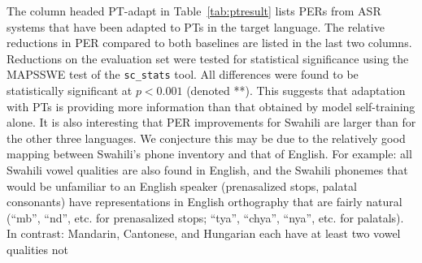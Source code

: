 The column headed {\sc PT-adapt} in Table~\ref{tab:ptresult} lists
PERs from ASR systems that have been adapted to PTs in the target
language.
The relative reductions in PER compared to both baselines
are listed in the last two columns.  Reductions on the evaluation set
were tested for statistical significance using the MAPSSWE test of the
{\tt sc\_stats} tool.  All differences were found to be statistically
significant at $p<0.001$ (denoted **).  This suggests that adaptation
with PTs is providing more information than that obtained by model
self-training alone. It is also interesting that PER
improvements for Swahili are larger than for the other three
languages. %
We conjecture this may be due to the relatively good mapping between
Swahili's phone inventory and that of English. For example: all Swahili
vowel qualities are also found in English, and the Swahili phonemes 
that would be unfamiliar to an English speaker (prenasalized stops, 
palatal consonants) have representations in English orthography that are 
fairly natural (``mb'', ``nd'', etc. for prenasalized stops; ``tya'', 
``chya'', ``nya'', etc. for palatals). In contrast: Mandarin, 
Cantonese, and Hungarian each have at least two vowel qualities not 
